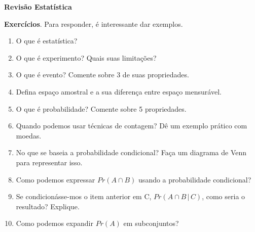 \documentclass[11pt, a4paper]{article}
\begin{document}
	\begin{center}
	\textbf{Revisão Estatística}
	\end{center}
\textbf{Exercícios}.
Para responder, é interessante dar exemplos.
\begin{enumerate}
\item O que é estatística?

\item O que é experimento? Quais suas limitações? 
\item O que é evento? Comente sobre 3 de suas propriedades.
\item Defina espaço amostral e a sua diferença entre espaço mensurável.
\item O que é probabilidade? Comente sobre 5 propriedades.
\item Quando podemos usar técnicas de contagem? Dê um exemplo prático com moedas.
\item No que se baseia a probabilidade condicional? Faça um diagrama de Venn para representar isso.
\item Como podemos expressar $Pr(A\cap B)$ usando a probabilidade condicional?
\item Se condicionásse-mos o item anterior em C, $Pr(A\cap B\,|\,C)$, como seria o resultado? Explique.
\item Como podemos expandir $Pr(A)$ em subconjuntos?


\end{enumerate}
\end{document}
